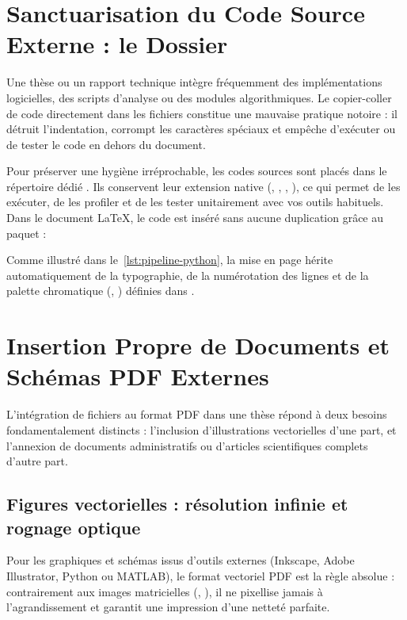 \section{Sanctuarisation du Code Source Externe : le Dossier }
\label{sec:listings-externe}

Une thèse ou un rapport technique intègre fréquemment des implémentations logicielles,
des scripts d'analyse ou des modules algorithmiques.
Le copier-coller de code directement dans les fichiers  constitue une mauvaise pratique notoire :
il détruit l'indentation, corrompt les caractères spéciaux
et empêche d'exécuter ou de tester le code en dehors du document.

Pour préserver une hygiène irréprochable, les codes sources sont placés
dans le répertoire dédié .
Ils conservent leur extension native (, , , ),
ce qui permet de les exécuter, de les profiler et de les tester unitairement avec vos outils habituels.
Dans le document \LaTeX{}, le code est inséré sans aucune duplication grâce au paquet  :



Comme illustré dans le~\cref{lst:pipeline-python},
la mise en page hérite automatiquement de la typographie,
de la numérotation des lignes et de la palette chromatique (, ) définies dans .

\section{Insertion Propre de Documents et Schémas PDF Externes}
\label{sec:insertion-pdf}

L'intégration de fichiers au format PDF dans une thèse répond à deux besoins fondamentalement distincts :
l'inclusion d'illustrations vectorielles d'une part,
et l'annexion de documents administratifs ou d'articles scientifiques complets d'autre part.

\subsection{Figures vectorielles : résolution infinie et rognage optique}
Pour les graphiques et schémas issus d'outils externes (Inkscape, Adobe Illustrator, Python ou MATLAB),
le format vectoriel PDF est la règle absolue :
contrairement aux images matricielles (, ),
il ne pixellise jamais à l'agrandissement et garantit une impression d'une netteté parfaite.

